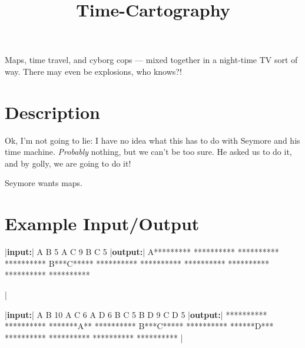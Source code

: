 \documentclass{../codeproblem}
\begin{document}
\title{Time-Cartography}

\begin{flavor}
  Maps, time travel, and cyborg cops --- mixed together in a
  night-time TV sort of way. There may even be explosions, who knows?!
\end{flavor}

\section*{Description}
Ok, I'm not going to lie: I have no idea what this has to do with
Seymore and his time machine. \emph{Probably} nothing, but we can't be
too sure. He asked us to do it, and by golly, we are going to do
it!

Seymore wants maps.
\section*{Example Input/Output}
\begin{minipage}{.5\linewidth}
  \begin{example}
|\textbf{input:}|
A B 5
A C 9
B C 5
|\textbf{output:}|
A*********
**********
**********
**********
B***C*****
**********
**********
**********
**********
**********
**********



|\end{example}
\end{minipage}
\begin{minipage}{.5\linewidth}
\begin{example}
|\textbf{input:}|
A B 10 
A C 6
A D 6
B C 5
B D 9
C D 5
|\textbf{output:}|
**********
**********
*******A**
**********
B***C*****
**********
******D***
**********
**********
**********
**********
|\end{example}
\end{minipage}
\end{document}

